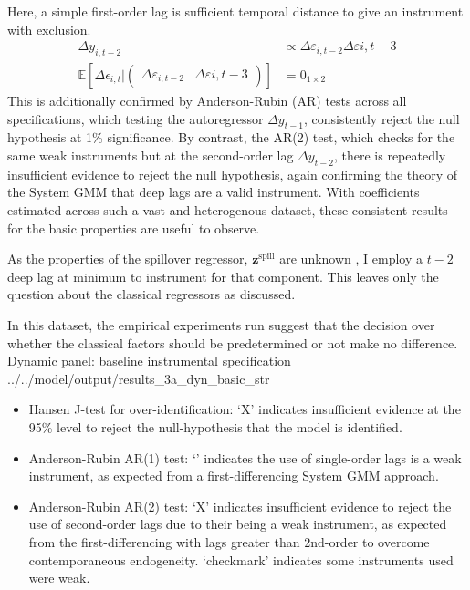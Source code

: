 Here, a simple first-order lag is sufficient temporal distance to give an instrument with exclusion.
\begin{align}
    \Delta y_{i,t-2} &\propto \Delta \varepsilon_{i,t-2} \Delta \varepsilon{i,t-3}
    \\
    \mathbb E[\Delta \epsilon_{i,t}\vert \begin{pmatrix}
        \Delta \varepsilon_{i,t-2} & \Delta \varepsilon{i,t-3}
    \end{pmatrix}] &= 0_{1\times 2}
\end{align}
This is additionally confirmed by Anderson-Rubin (AR) tests across all specifications,
which testing the autoregressor $\Delta y_{t-1}$,
consistently reject the null hypothesis at 1\% significance.
By contrast, the AR(2) test, which checks for the same weak instruments
but at the second-order lag $\Delta y_{t-2}$,
there is repeatedly insufficient evidence to reject the null hypothesis,
again confirming the theory of the System GMM that deep lags are a valid instrument.
With coefficients estimated across such a vast and heterogenous dataset,
these consistent results for the basic properties are useful to observe.
\par
As the properties of the spillover regressor, $\mathbf z^\text{spill}$ are unknown ,
I employ a $t-2$ deep lag at minimum to instrument for that component.
This leaves only the question about the classical regressors as discussed.
\par
In this dataset, the empirical experiments run suggest that the decision
over whether the classical factors should be predetermined or not
make no difference.
\wraptable
    {Dynamic panel: baseline instrumental specification}
    {../../model/output/results_3a_dyn_basic_str}
    {
        \begin{itemize}
        \item[] Hansen J-test for over-identification: `\textsf{X}' indicates insufficient evidence
                at the 95\% level to reject the null-hypothesis that the model is identified.
        \item[] Anderson-Rubin AR(1) test:  `\checkmark' indicates the use of single-order lags is a weak instrument,
                as expected from a first-differencing System GMM approach.
        \item[] Anderson-Rubin AR(2) test: `\textsf{X}' indicates insufficient evidence to
                reject the use of second-order lags due to their being a weak instrument,
                as expected from the first-differencing with lags greater than 2nd-order to overcome contemporaneous endogeneity.
                `checkmark' indicates some instruments used were weak.
        \end{itemize}
    }

